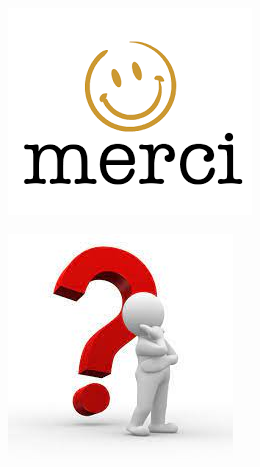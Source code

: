 \documentclass[11pt]{beamer}
\begin{document}
\begin{frame}
\begin{minipage}{0.48\textwidth}
\centering
\includegraphics[width=\textwidth]{merci2.png}
\end{minipage}\hfill
\begin{minipage}{0.48\textwidth}
\centering
\includegraphics[width=\textwidth]{question.png}
\end{minipage}
\end{frame}
\end{document}
